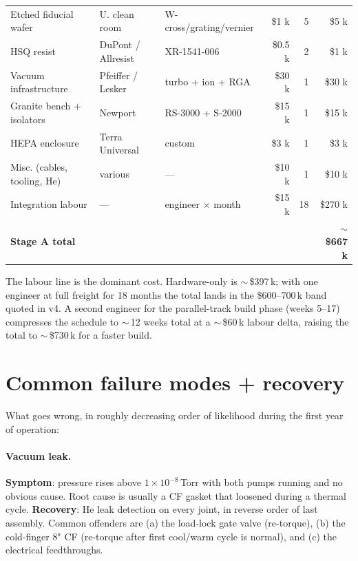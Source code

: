 \documentclass[11pt,letterpaper]{article}
\begin{document}
\begin{center}
\begin{longtable}{p{4.5cm} p{3cm} p{4cm} r r r}
Etched fiducial wafer          & U. clean room       & W-cross/grating/vernier & \$1 k  & 5  & \$5 k   \\
HSQ resist                     & DuPont / Allresist  & XR-1541-006             & \$0.5 k & 2 & \$1 k   \\
Vacuum infrastructure          & Pfeiffer / Lesker   & turbo + ion + RGA       & \$30 k & 1  & \$30 k  \\
Granite bench + isolators      & Newport             & RS-3000 + S-2000        & \$15 k & 1  & \$15 k  \\
HEPA enclosure                 & Terra Universal     & custom                  & \$3 k  & 1  & \$3 k   \\
Misc. (cables, tooling, He)    & various             & ---                     & \$10 k & 1  & \$10 k  \\
Integration labour             & ---                 & engineer $\times$ month & \$15 k & 18 & \$270 k \\
\midrule
\textbf{Stage A total}         &                     &                         &        &    & \textbf{$\sim$\$667 k} \\
\bottomrule
\end{longtable}
\end{center}

The labour line is the dominant cost. Hardware-only is $\sim$\,\$397\,k; with one engineer at full freight for 18 months the total lands in the \$600--700\,k band quoted in v4. A second engineer for the parallel-track build phase (weeks 5--17) compresses the schedule to $\sim$\,12 weeks total at a $\sim$\,\$60\,k labour delta, raising the total to $\sim$\,\$730\,k for a faster build.

\section{Common failure modes + recovery}

What goes wrong, in roughly decreasing order of likelihood during the first year of operation:

\paragraph{Vacuum leak.} \textbf{Symptom}: pressure rises above $1 \times 10^{-8}$\,Torr with both pumps running and no obvious cause. Root cause is usually a CF gasket that loosened during a thermal cycle. \textbf{Recovery}: He leak detection on every joint, in reverse order of last assembly. Common offenders are (a) the load-lock gate valve (re-torque), (b) the cold-finger 8" CF (re-torque after first cool/warm cycle is normal), and (c) the electrical feedthroughs.
\end{document}
